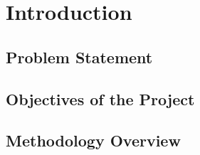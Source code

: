 \section{Introduction}

\subsection{Problem Statement}
\subsection{Objectives of the Project}
\subsection{Methodology Overview}